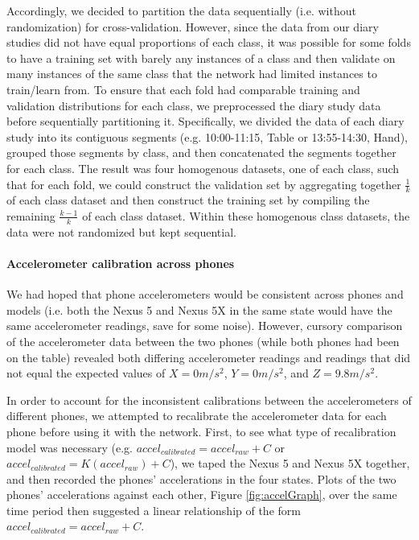 Accordingly, we decided to partition the data sequentially (i.e. without randomization)
for cross-validation. 
However, since the data from our diary studies
did not have equal proportions of each class, it was possible for some folds
to have a training set with barely any instances of a class and then validate
on many instances of the same class that the network had limited instances
to train/learn from. 
To ensure that each fold had comparable training and validation distributions 
for each class, we preprocessed the diary study data before sequentially partitioning it. 
Specifically, we divided the data of each diary study into its 
contiguous segments (e.g. 10:00-11:15, Table or 13:55-14:30, Hand), grouped 
those segments by class, and then concatenated the segments together for each class. 
The result was four 
homogenous datasets, one of each class, such that for each fold, we could construct
the validation set by aggregating together $\frac{1}{k}$ of each class dataset and then
construct the training set by compiling the remaining $\frac{k - 1}{k}$ of each class dataset.
Within these homogenous class datasets, the data were not randomized but 
kept sequential.

\paragraph{Accelerometer calibration across phones}
We had hoped that phone accelerometers would be consistent across phones and models (i.e.
both the Nexus 5 and Nexus 5X in the same state would have the same accelerometer
readings, save for some noise). 
However, cursory comparison of the accelerometer data between the two phones 
(while both phones had been on the table) revealed both differing accelerometer readings and readings
that did not equal the expected values of $X = 0m/s^2$, $Y = 0m/s^2$, and $Z = 9.8m/s^2$. 




In order to account for the inconsistent calibrations between the accelerometers of different phones, we
attempted to recalibrate the accelerometer data for each phone before using it with the network. 
First, to see what type of recalibration model was necessary (e.g. $accel_{calibrated} = accel_{raw} + C$ or
$accel_{calibrated} = K(accel_{raw}) + C$), we taped the Nexus 5 and Nexus 5X together, and then recorded
the phones' accelerations in the four states. 
Plots of the two phones' accelerations against each other, Figure \ref{fig:accelGraph}, over the same time period
then suggested a linear relationship of the form $accel_{calibrated} = accel_{raw} + C$. 

